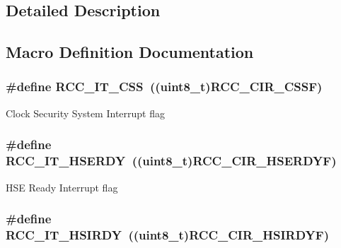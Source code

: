 \subsection{Detailed Description}


\subsection{Macro Definition Documentation}
\hypertarget{group___r_c_c___interrupt_ga9bb34a4912d2084dc1c0834eb53aa7a3}{
\subsubsection[{R\-C\-C\-\_\-\-I\-T\-\_\-\-C\-S\-S}]{\setlength{\rightskip}{0pt plus 5cm}\#define R\-C\-C\-\_\-\-I\-T\-\_\-\-C\-S\-S~((uint8\-\_\-t){\bf R\-C\-C\-\_\-\-C\-I\-R\-\_\-\-C\-S\-S\-F})}}\label{group___r_c_c___interrupt_ga9bb34a4912d2084dc1c0834eb53aa7a3}
Clock Security System Interrupt flag \hypertarget{group___r_c_c___interrupt_gad13eaede352bca59611e6cae68665866}{
\subsubsection[{R\-C\-C\-\_\-\-I\-T\-\_\-\-H\-S\-E\-R\-D\-Y}]{\setlength{\rightskip}{0pt plus 5cm}\#define R\-C\-C\-\_\-\-I\-T\-\_\-\-H\-S\-E\-R\-D\-Y~((uint8\-\_\-t){\bf R\-C\-C\-\_\-\-C\-I\-R\-\_\-\-H\-S\-E\-R\-D\-Y\-F})}}\label{group___r_c_c___interrupt_gad13eaede352bca59611e6cae68665866}
H\-S\-E Ready Interrupt flag \hypertarget{group___r_c_c___interrupt_ga69637e51b71f73f519c8c0a0613d042f}{
\subsubsection[{R\-C\-C\-\_\-\-I\-T\-\_\-\-H\-S\-I\-R\-D\-Y}]{\setlength{\rightskip}{0pt plus 5cm}\#define R\-C\-C\-\_\-\-I\-T\-\_\-\-H\-S\-I\-R\-D\-Y~((uint8\-\_\-t){\bf R\-C\-C\-\_\-\-C\-I\-R\-\_\-\-H\-S\-I\-R\-D\-Y\-F})}}\label{group___r_c_c___interrupt_ga69637e51b71f73f519c8c0a0613d042f}
